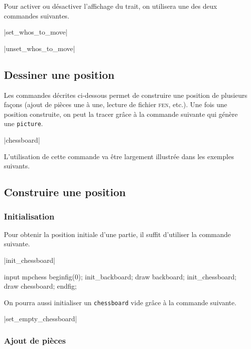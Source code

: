\documentclass[french]{ltxdoc}
\begin{document}
Pour activer ou désactiver l’affichage du trait, on utilisera une des deux commandes suivantes.

\commande|set_whos_to_move|\smallskip


\commande|unset_whos_to_move|\smallskip

\subsection{Dessiner une position}

Les commandes décrites ci-dessous permet de construire une position de plusieurs
façons (ajout de pièces une à une, lecture de fichier \textsc{fen}, etc.). Une
fois une position construite, on peut la tracer grâce à la commande suivante qui
génère une \lstinline+picture+.

\commande|chessboard|\smallskip \label{com:chessboard}

L’utilisation de cette commande va être largement illustrée dans les exemples suivants.

\subsection{Construire une position}

\subsubsection{Initialisation}

Pour obtenir la position initiale d’une partie, il suffit d’utiliser la commande suivante.

\commande|init_chessboard|\smallskip

\begin{ExempleMP}
input mpchess
beginfig(0);
init_backboard;
draw backboard;
init_chessboard;
draw chessboard;
endfig;
\end{ExempleMP}

On pourra aussi initialiser un \lstinline+chessboard+ vide grâce à la commande suivante.

\commande|set_empty_chessboard|\smallskip

\subsubsection{Ajout de pièces}
\end{document}
